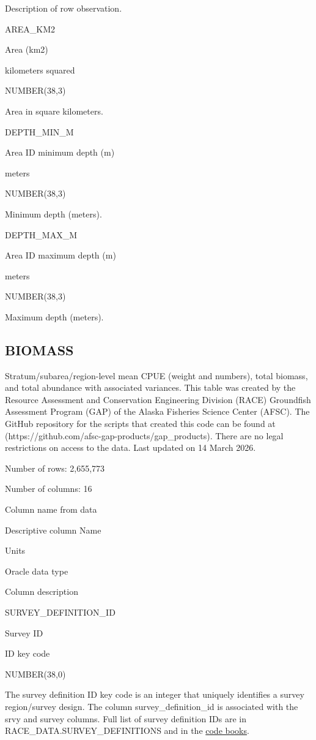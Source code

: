 \documentclass[
  letterpaper,
  oneside,
  open=any]{scrbook}
\begin{document}
Description of row observation.

AREA\_KM2

Area (km2)

kilometers squared

NUMBER(38,3)

Area in square kilometers.

DEPTH\_MIN\_M

Area ID minimum depth (m)

meters

NUMBER(38,3)

Minimum depth (meters).

DEPTH\_MAX\_M

Area ID maximum depth (m)

meters

NUMBER(38,3)

Maximum depth (meters).

\subsection{BIOMASS}\label{biomass}

Stratum/subarea/region-level mean CPUE (weight and numbers), total
biomass, and total abundance with associated variances. This table was
created by the Resource Assessment and Conservation Engineering Division
(RACE) Groundfish Assessment Program (GAP) of the Alaska Fisheries
Science Center (AFSC). The GitHub repository for the scripts that
created this code can be found at
(https://github.com/afsc-gap-products/gap\_products). There are no legal
restrictions on access to the data. Last updated on 14 March 2026.

Number of rows: 2,655,773

Number of columns: 16

Column name from data

Descriptive column Name

Units

Oracle data type

Column description

SURVEY\_DEFINITION\_ID

Survey ID

ID key code

NUMBER(38,0)

The survey definition ID key code is an integer that uniquely identifies
a survey region/survey design. The column survey\_definition\_id is
associated with the srvy and survey columns. Full list of survey
definition IDs are in RACE\_DATA.SURVEY\_DEFINITIONS and in the
\href{https://www.fisheries.noaa.gov/resource/document/groundfish-survey-species-code-manual-and-data-codes-manual}{code
books}.
\end{document}
